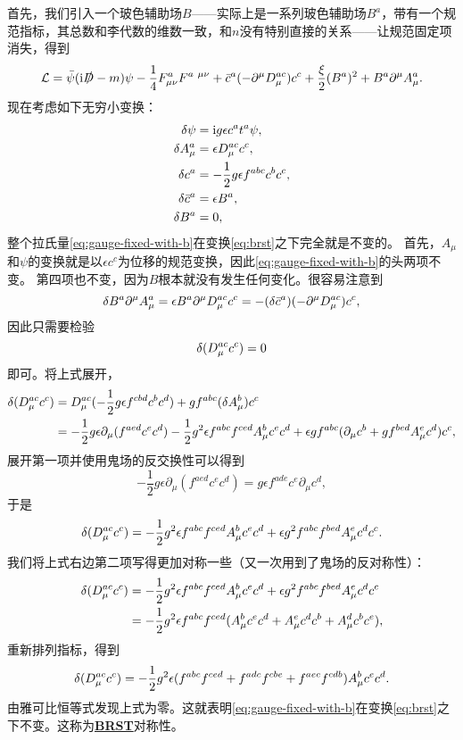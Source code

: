 \documentclass[hyperref, UTF8, a4paper]{ctexart}
\newcommand*{\ii}{\mathrm{i}}
\newcommand{\concept}[1]{\underline{\textbf{#1}}}
\begin{document}
首先，我们引入一个玻色辅助场$B$——实际上是一系列玻色辅助场$B^a$，带有一个规范指标，其总数和李代数的维数一致，和$n$没有特别直接的关系——让规范固定项消失，得到
\begin{equation}
    \mathcal{L} = \bar{\psi} (\ii \slashed{D} - m) \psi - \frac{1}{4} F_{\mu \nu}^a F^{a \ \mu \nu} + \bar{c}^a (- \partial^\mu D_\mu^{ac}) c^c + \frac{\xi}{2} (B^a)^2 + B^a  \partial^\mu A_\mu^a. 
    \label{eq:gauge-fixed-with-b}
\end{equation}
现在考虑如下无穷小变换：
\begin{equation}
    \begin{aligned}
        \var{\psi} &= \ii g \epsilon c^a t^a \psi, \\
        \var{A^a_\mu} &= \epsilon D_\mu^{ac} c^c, \\
        \var{c^a} &= - \frac{1}{2} g \epsilon f^{abc} c^b c^c, \\
        \var{\bar{c}^a} &= \epsilon B^a, \\
        \var{B^a} &= 0,
    \end{aligned}
    \label{eq:brst}
\end{equation}
整个拉氏量\eqref{eq:gauge-fixed-with-b}在变换\eqref{eq:brst}之下完全就是不变的。
首先，$A_\mu$和$\psi$的变换就是以$\epsilon c^c$为位移的规范变换，因此\eqref{eq:gauge-fixed-with-b}的头两项不变。
第四项也不变，因为$B$根本就没有发生任何变化。很容易注意到
\[
    \var{B^a \partial^\mu A_\mu^a} = \epsilon B^a \partial^\mu D_\mu^{ac} c^c = - (\var{\bar{c}^a}) (- \partial^\mu D_\mu^{ac}) c^c,
\]
因此只需要检验
\[
    \var{(D_\mu^{ac} c^c)} = 0
\]
即可。将上式展开，
\[
    \begin{aligned}
        \var{(D_\mu^{ac} c^c)} &= D^{ac}_\mu (- \frac{1}{2} g \epsilon f^{cbd} c^b c^d) + g f^{abc} (\var{A_\mu^b}) c^c \\
        &= - \frac{1}{2} g \epsilon \partial_\mu (f^{aed} c^e c^d) - \frac{1}{2} g^2 \epsilon f^{abc} f^{ced} A_\mu^b c^e c^d + \epsilon g f^{abc} (\partial_\mu c^b + g f^{bed} A_\mu^e c^d) c^c ,
    \end{aligned}
\]
展开第一项并使用鬼场的反交换性可以得到
\[
    - \frac{1}{2} g \epsilon \partial_\mu (f^{aed} c^e c^d) = g \epsilon f^{ade} c^e \partial_\mu c^d,
\]
于是
\[
    \var{(D_\mu^{ac} c^c)} = - \frac{1}{2} g^2 \epsilon f^{abc} f^{ced} A_\mu^b c^e c^d + \epsilon g^2 f^{abc} f^{bed} A_\mu^e c^d c^c.
\]
我们将上式右边第二项写得更加对称一些（又一次用到了鬼场的反对称性）：
\[
    \begin{aligned}
        \var{(D_\mu^{ac} c^c)} &= - \frac{1}{2} g^2 \epsilon f^{abc} f^{ced} A_\mu^b c^e c^d + \epsilon g^2 f^{abc} f^{bed} A_\mu^e c^d c^c \\
        &= - \frac{1}{2} g^2 \epsilon f^{abc} f^{ced} (A_\mu^b c^e c^d + A^e_\mu c^d c^b + A_\mu^d c^b c^e),
    \end{aligned}
\]
重新排列指标，得到
\[
    \var{(D_\mu^{ac} c^c)} = - \frac{1}{2} g^2 \epsilon (f^{abc} f^{ced} + f^{adc} f^{cbe} + f^{aec} f^{cdb}) A_\mu^b c^e c^d.
\]
由雅可比恒等式发现上式为零。这就表明\eqref{eq:gauge-fixed-with-b}在变换\eqref{eq:brst}之下不变。这称为\concept{BRST}对称性。
\end{document}
